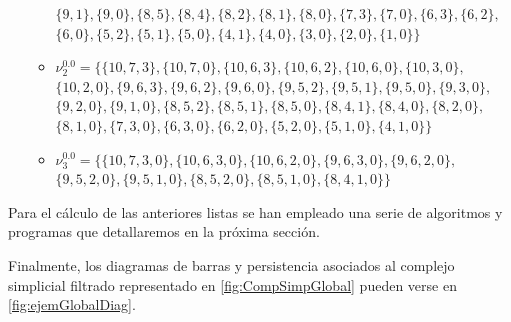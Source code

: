\documentclass[12pt, a4paper, twoside]{book}
\numberwithin{equation}{section}
\theoremstyle{definition}
\newenvironment{ejem}
  {\pushQED{\qed}\renewcommand{\qedsymbol}{$\blacktriangleleft$}\ejemplo}
  {\popQED\endejemplo}
\theoremstyle{remark}
\theoremstyle{plain}
\begin{document}
\begin{ejem}
\begin{itemize}
\begin{itemize}
						$\{9, 1\},\{9, 0\},\{8, 5\},\{8, 4\},\{8, 2\},\{8, 1\},\{8, 0\},\{7, 3\},\{7, 0\},\{6, 3\},\{6, 2\},$\\
					$\{6, 0\},\{5, 2\},\{5, 1\},\{5, 0\},\{4, 1\},\{4, 0\},\{3, 0\},\{2, 0\},\{1, 0\}\}$
					\item {\Large $\nu$}$^{0.0}_{2}=\{\{10, 7, 3\},\{10, 7, 0\},\{10, 6, 3\},\{10, 6, 2\},\{10, 6, 0\},\{10, 3, 0\},$\\
							$\{10, 2, 0\},\{9, 6, 3\},\{9, 6, 2\},\{9, 6, 0\},\{9, 5, 2\},\{9, 5, 1\},\{9, 5, 0\},\{9, 3, 0\},$\\
							$\{9, 2, 0\},\{9, 1, 0\},\{8, 5, 2\},\{8, 5, 1\},\{8, 5, 0\},\{8, 4, 1\},\{8, 4, 0\},\{8, 2, 0\},$\\
						$\{8, 1, 0\},\{7, 3, 0\},\{6, 3, 0\},\{6, 2, 0\},\{5, 2, 0\},\{5, 1, 0\},\{4, 1, 0\}\}$
					\item {\Large $\nu$}$^{0.0}_{3}=\{\{10, 7, 3, 0\},\{10, 6, 3, 0\},\{10, 6, 2, 0\},\{9, 6, 3, 0\},\{9, 6, 2, 0\},$\\
						$\{9, 5, 2, 0\},\{9, 5, 1, 0\},\{8, 5, 2, 0\},\{8, 5, 1, 0\},\{8, 4, 1, 0\}\}$
				\end{itemize}
		\end{itemize}
	Para el cálculo de las anteriores listas se han empleado una serie de 
	algoritmos y programas que detallaremos en la próxima sección.

	Finalmente, los diagramas de barras y persistencia asociados al
	complejo simplicial filtrado representado en 
	\autoref{fig:CompSimpGlobal} pueden verse en 
	\autoref{fig:ejemGlobalDiag}.
	

\end{ejem}
\end{document}
